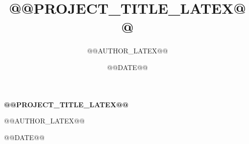 \documentclass[11pt,a4paper]{article}
\title{@@PROJECT_TITLE_LATEX@@}
\author{@@AUTHOR_LATEX@@}
\date{@@DATE@@}
\begin{document}
\raggedbottom

\hypersetup{pageanchor=false}
\begin{titlepage}
  \centering
  \vspace*{2.2cm}
  {\LARGE\bfseries @@PROJECT_TITLE_LATEX@@\par}
  \vfill
  {\Large @@AUTHOR_LATEX@@\par}
  \vspace{0.4cm}
  {\large @@DATE@@\par}
\end{titlepage}
\hypersetup{pageanchor=true}









\printbibliography
\end{document}
